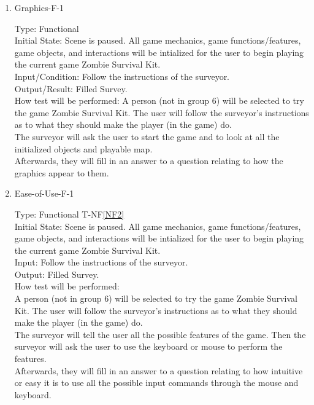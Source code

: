 \documentclass[12pt, titlepage]{article}
\newcounter{ftnum}
\newcounter{nftnum}
\newcommand{\nfref}[1]{T-NF\ref{#1}}
\begin{document}
\begin{enumerate}
	
	\item{Graphics-F-1\\}  \label{NF1}
	
	Type: Functional \\
	
	Initial State: Scene is paused. All game mechanics, game functions/features, game objects, and interactions will be intialized for the user to begin playing the current game Zombie Survival Kit.\\
	
	Input/Condition: Follow the instructions of the surveyor. \\
	
	Output/Result: Filled Survey. \\
	
	How test will be performed: A person (not in group 6) will be selected to try the game Zombie Survival Kit. The user will follow the surveyor's instructions as to what they should make the player (in the game) do. \\
	The surveyor will ask the user to start the game and to look at all the initialized objects and playable map.\\
	Afterwards, they will fill in an answer to a question relating to how the graphics appear to them.
	
	\item{Ease-of-Use-F-1\\}  \label{NF2}
	
	Type: Functional \nfref{NF2}\\
	
	Initial State: Scene is paused. All game mechanics, game functions/features, game objects, and interactions will be intialized for the user to begin playing the current game Zombie Survival Kit. \\
	
	Input: Follow the instructions of the surveyor. \\
	
	Output: Filled Survey. \\
	
	How test will be performed:\\ A person (not in group 6) will be selected to try the game Zombie Survival Kit. The user will follow the surveyor's instructions as to what they should make the player (in the game) do.\\  
	The surveyor will tell the user all the possible features of the game. Then the surveyor will ask the user to use the keyboard or mouse to perform the features. \\
	Afterwards, they will fill in an answer to a question relating to how intuitive or easy it is to use all the possible input commands through the mouse and keyboard.\\
	

\end{enumerate}
\end{document}
